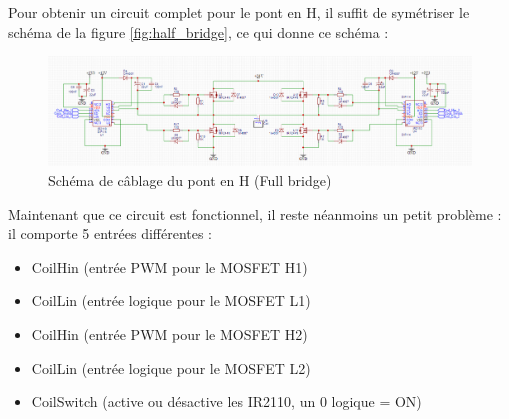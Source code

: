 \documentclass{article}
\begin{document}
\noindent Pour obtenir un circuit complet pour le pont en H, il suffit de symétriser le schéma de la figure \ref{fig:half_bridge}, ce qui donne ce schéma :
    \begin{figure}[H]
    \centering
    \includegraphics[width=0.7\linewidth]{Images/full_bridge.png}
    \caption{Schéma de câblage du pont en H (Full bridge)
    }
    \label{fig:full_bridge}
\end{figure}
\noindent
Maintenant que ce circuit est fonctionnel, il reste néanmoins un petit problème : il comporte 5 entrées différentes :
\begin{itemize}
    \item Coil\textunderscore Hin (entrée PWM pour le MOSFET H1)
    \item Coil\textunderscore Lin (entrée logique pour le MOSFET L1)
    \item Coil\textunderscore Hin (entrée PWM pour le MOSFET H2)
    \item Coil\textunderscore Lin (entrée logique pour le MOSFET L2)
    \item Coil\textunderscore Switch (active ou désactive les IR2110, un 0 logique = ON)
\end{itemize}
\end{document}
